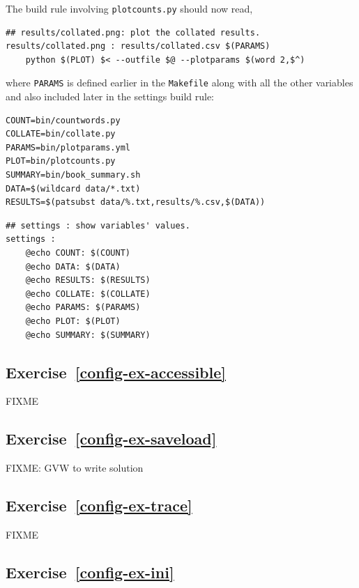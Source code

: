 \documentclass[
]{krantz}
\begin{document}
The build rule involving \texttt{plotcounts.py} should now read,

\begin{verbatim}
## results/collated.png: plot the collated results.
results/collated.png : results/collated.csv $(PARAMS)
    python $(PLOT) $< --outfile $@ --plotparams $(word 2,$^)
\end{verbatim}

where \texttt{PARAMS} is defined earlier in the \texttt{Makefile}
along with all the other variables and
also included later in the settings build rule:

\begin{verbatim}
COUNT=bin/countwords.py
COLLATE=bin/collate.py
PARAMS=bin/plotparams.yml
PLOT=bin/plotcounts.py
SUMMARY=bin/book_summary.sh
DATA=$(wildcard data/*.txt)
RESULTS=$(patsubst data/%.txt,results/%.csv,$(DATA))
\end{verbatim}

\begin{verbatim}
## settings : show variables' values.
settings :
    @echo COUNT: $(COUNT)
    @echo DATA: $(DATA)
    @echo RESULTS: $(RESULTS)
    @echo COLLATE: $(COLLATE)
    @echo PARAMS: $(PARAMS)
    @echo PLOT: $(PLOT)
    @echo SUMMARY: $(SUMMARY)
\end{verbatim}

\hypertarget{exercise-refconfig-ex-accessible}{%
\subsection*{Exercise~\ref{config-ex-accessible}}\label{exercise-refconfig-ex-accessible}}


FIXME

\hypertarget{exercise-refconfig-ex-saveload}{%
\subsection*{Exercise~\ref{config-ex-saveload}}\label{exercise-refconfig-ex-saveload}}


FIXME: GVW to write solution

\hypertarget{exercise-refconfig-ex-trace}{%
\subsection*{Exercise~\ref{config-ex-trace}}\label{exercise-refconfig-ex-trace}}


FIXME

\hypertarget{exercise-refconfig-ex-ini}{%
\subsection*{Exercise~\ref{config-ex-ini}}\label{exercise-refconfig-ex-ini}}
\end{document}
